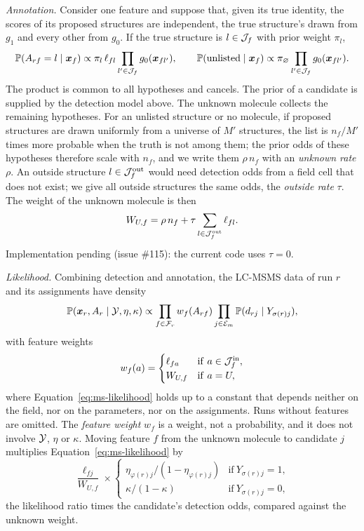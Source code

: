 \documentclass[
11pt, %
oneside, %
english, %
singlespacing, %
headsepline, %
chapterinoneline, %
]{MastersDoctoralThesis} %
\def\P{\mathbb{P}}
\def\x{\boldsymbol{x}}
\def\E{{\cal E}}
\def\Y{{\cal Y}}
\def\F{{\cal F}}
\def\J{{\cal J}}
\def\Jin{\J^{\mathrm{in}}}
\def\Jout{\J^{\mathrm{out}}}
\begin{document}
\textit{Annotation.} Consider one feature and suppose that, given its true identity, the scores of its proposed structures are independent, the true structure's drawn from $g_1$ and every other from $g_0$. If the true structure is $l \in \J_f$ with prior weight $\pi_l$,
\begin{equation*}
	\P(A_{rf} = l \mid \x_f) \propto \pi_l\, \ell_{fl} \prod_{l' \in \J_f} g_0(\x_{fl'}),
	\qquad
	\P(\text{unlisted} \mid \x_f) \propto \pi_{\varnothing} \prod_{l' \in \J_f} g_0(\x_{fl'}).
\end{equation*}
The product is common to all hypotheses and cancels. The prior of a candidate is supplied by the detection model above. The unknown molecule collects the remaining hypotheses. For an unlisted structure or no molecule, if proposed structures are drawn uniformly from a universe of $M'$ structures, the list is $n_f/M'$ times more probable when the truth is not among them; the prior odds of these hypotheses therefore scale with $n_f$, and we write them $\rho\, n_f$ with an \emph{unknown rate} $\rho$. An outside structure $l \in \Jout_f$ would need detection odds from a field cell that does not exist; we give all outside structures the same odds, the \emph{outside rate} $\tau$. The weight of the unknown molecule is then
\begin{equation}
	\label{eq:unknown-weight}
	W_{U,f} = \rho\, n_f + \tau \sum_{l \in \Jout_f} \ell_{fl}.
\end{equation}
\alert{Implementation pending (issue \#115): the current code uses $\tau = 0$.}

\textit{Likelihood.} Combining detection and annotation, the LC-MSMS data of run $r$ and its assignments have density
\begin{equation}
	\label{eq:ms-likelihood}
	\P(\x_r, A_r \mid \Y, \eta, \kappa) \propto \prod_{f \in \F_r} w_f(A_{rf}) \prod_{j \in \E_m} \P(d_{rj} \mid Y_{\sigma(r)j}),
\end{equation}
with feature weights
\begin{equation*}
	w_f(a) =
	\begin{cases}
		\ell_{fa} & \mathrm{if\ } a \in \Jin_f,\\
		W_{U,f}   & \mathrm{if\ } a = U,
	\end{cases}
\end{equation*}
where Equation~\eqref{eq:ms-likelihood} holds up to a constant that depends neither on the field, nor on the parameters, nor on the assignments. Runs without features are omitted. The \emph{feature weight} $w_f$ is a weight, not a probability, and it does not involve $\Y$, $\eta$ or $\kappa$. Moving feature $f$ from the unknown molecule to candidate $j$ multiplies Equation~\eqref{eq:ms-likelihood} by
\begin{equation*}
	\frac{\ell_{fj}}{W_{U,f}} \times
	\begin{cases}
		\eta_{\varphi(r)j}/(1-\eta_{\varphi(r)j}) & \mathrm{if\ } Y_{\sigma(r)j} = 1,\\
		\kappa/(1-\kappa)                          & \mathrm{if\ } Y_{\sigma(r)j} = 0,
	\end{cases}
\end{equation*}
the likelihood ratio times the candidate's detection odds, compared against the unknown weight.
\end{document}
